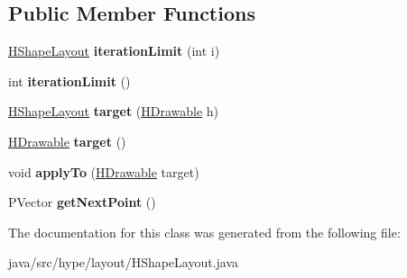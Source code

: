 \subsection*{Public Member Functions}
\begin{DoxyCompactItemize}
\item 
\hypertarget{classhype_1_1layout_1_1_h_shape_layout_ab185aa25cfb83352b1ede79870add2a9}{\hyperlink{classhype_1_1layout_1_1_h_shape_layout}{H\-Shape\-Layout} {\bfseries iteration\-Limit} (int i)}\label{classhype_1_1layout_1_1_h_shape_layout_ab185aa25cfb83352b1ede79870add2a9}

\item 
\hypertarget{classhype_1_1layout_1_1_h_shape_layout_a91edcfe8e64b8498bcd44b55ee1bd584}{int {\bfseries iteration\-Limit} ()}\label{classhype_1_1layout_1_1_h_shape_layout_a91edcfe8e64b8498bcd44b55ee1bd584}

\item 
\hypertarget{classhype_1_1layout_1_1_h_shape_layout_a2e0987563bd07ae17cd1d46ad77b1fb4}{\hyperlink{classhype_1_1layout_1_1_h_shape_layout}{H\-Shape\-Layout} {\bfseries target} (\hyperlink{classhype_1_1drawable_1_1_h_drawable}{H\-Drawable} h)}\label{classhype_1_1layout_1_1_h_shape_layout_a2e0987563bd07ae17cd1d46ad77b1fb4}

\item 
\hypertarget{classhype_1_1layout_1_1_h_shape_layout_ab60567fb59e2444d8c85d9f085656fcd}{\hyperlink{classhype_1_1drawable_1_1_h_drawable}{H\-Drawable} {\bfseries target} ()}\label{classhype_1_1layout_1_1_h_shape_layout_ab60567fb59e2444d8c85d9f085656fcd}

\item 
\hypertarget{classhype_1_1layout_1_1_h_shape_layout_a5788eb5b0c7661edad790d500e359822}{void {\bfseries apply\-To} (\hyperlink{classhype_1_1drawable_1_1_h_drawable}{H\-Drawable} target)}\label{classhype_1_1layout_1_1_h_shape_layout_a5788eb5b0c7661edad790d500e359822}

\item 
\hypertarget{classhype_1_1layout_1_1_h_shape_layout_a7afb99af936a130f8b22fb7262d5ac46}{P\-Vector {\bfseries get\-Next\-Point} ()}\label{classhype_1_1layout_1_1_h_shape_layout_a7afb99af936a130f8b22fb7262d5ac46}

\end{DoxyCompactItemize}


The documentation for this class was generated from the following file\-:\begin{DoxyCompactItemize}
\item 
java/src/hype/layout/H\-Shape\-Layout.\-java\end{DoxyCompactItemize}
